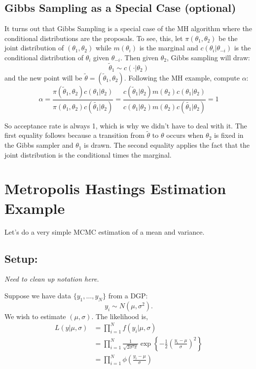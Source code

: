 \documentclass[twoside]{article}
\begin{document}
\subsection{Gibbs Sampling as a Special Case (optional)}

It turns out that Gibbs Sampling is a special case of the MH algorithm where the conditional distributions are the proposals. To see, this, let $\pi(\theta_1, \theta_2)$ be the joint distribution of $(\theta_1, \theta_2)$ while $m(\theta_i)$ is the marginal and $c(\theta_i|\theta_{-i})$ is the conditional distribution of $\theta_i$ given $\theta_{-i}$. 
Then given $\theta_2$, Gibbs sampling will draw:
$$\tilde{\theta}_1 \sim c( \cdot | \theta_2)$$
and the new point will be $\tilde{\theta} = (\tilde{\theta}_1, \theta_2)$. Following the MH example, compute $\alpha$: 
$$ \alpha = \frac{ \pi(\tilde{\theta}_1, \theta_2)c(\theta_1 | \theta_2)}{ \pi(\theta_1, \theta_2)c(\tilde{\theta_1} | \theta_2)} = 
 \frac{ c(\tilde{\theta}_1| \theta_2)m(\theta_2)c(\theta_1 | \theta_2)}{ c(\theta_1 | \theta_2)m(\theta_2)c(\tilde{\theta_1} | \theta_2)} = 1$$
 
So acceptance rate is always 1, which is why we didn't have to deal with it.  The first equality follows because a transition from $\tilde{\theta}$ to
$\theta$ occurs when $\theta_2$ is fixed in the Gibbs sampler and $\theta_1$ is drawn. The second equality applies the fact that the joint distribution
is the conditional times the marginal. 

\section{Metropolis Hastings Estimation Example}

Let's do a very simple MCMC estimation of a mean and variance. 

\subsection{Setup:}

\emph{Need to clean up notation here.}

Suppose we have data $\{y_1, \ldots, y_N\}$ from a DGP: 
$$ y_i \sim N(\mu, \sigma^2).$$ 
We wish to estimate $(\mu, \sigma)$. The likelihood is, 
\begin{align*}
 L(y | \mu, \sigma) & = \prod_{i=1}^N f(y_i | \mu, \sigma) \\
 & =  \prod_{i=1}^N \frac{1}{\sqrt{2 \sigma^2 \pi}} \exp \left\{ - \frac{1}{2} \left( \frac{y_i - \mu}{\sigma} \right)^2 \right\} \\
 & = \prod_{i=1}^N \phi\left( \frac{y_i - \mu}{\sigma} \right) %
 \end{align*}
\end{document}
